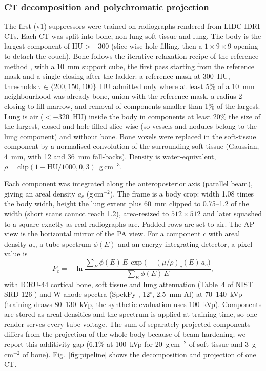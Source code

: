 \subsubsection{CT decomposition and polychromatic projection}
\label{sec:m-physics}
The first (v1) suppressors were trained on radiographs rendered from LIDC-IDRI CTs. Each CT was split into bone, non-lung soft tissue and
lung. The body is the largest component of $\mathrm{HU}>-300$ (slice-wise hole filling, then a $1{\times}9{\times}9$ opening to detach the
couch). Bone follows the iterative-relaxation recipe of the reference method \cite[Algorithm~1]{angaitkar2026anatomy}, with a 10~mm
support cube, the first pass starting from the reference mask and a single closing after the ladder: a reference mask at 300~HU,
thresholds $\tau\in\{200,150,100\}$~HU admitted only where at least 5\% of a 10~mm neighbourhood was already bone, union with the reference
mask, a radius-2 closing to fill marrow, and removal of components smaller than 1\% of the largest. Lung is air ($<-320$~HU) inside the
body in components at least 20\% the size of the largest, closed and hole-filled slice-wise (so vessels and nodules belong to the lung
component) and without bone. Bone voxels were replaced in the soft-tissue component by a normalised convolution of the surrounding soft
tissue (Gaussian, 4~mm, with 12 and 36~mm fall-backs). Density is water-equivalent, $\rho=\mathrm{clip}(1+\mathrm{HU}/1000,0,3)$~g\,cm$^{-3}$.

Each component was integrated along the anteroposterior axis (parallel beam), giving an areal density $a_c$ (g\,cm$^{-2}$). The frame is a
body crop: width 1.08 times the body width, height the lung extent plus 60~mm clipped to 0.75--1.2 of the width (short scans cannot reach
1.2), area-resized to $512\times512$ and later squashed to a square exactly as real radiographs are. Padded rows are set to air. The AP
view is the horizontal mirror of the PA view. For a component $c$ with areal density $a_c$, a tube spectrum $\phi(E)$ and an
energy-integrating detector, a pixel value is
\begin{equation}
P_c=-\ln\frac{\sum_E \phi(E)\,E\,\exp\!\big(-(\mu/\rho)_c(E)\,a_c\big)}{\sum_E\phi(E)\,E},
\label{eq:physics}
\end{equation}
with ICRU-44 \cite{icru1989report44} cortical bone, soft tissue and lung attenuation (Table~4 of NIST SRD 126 \cite{hubbell2004xraymass})
and W-anode spectra (SpekPy \cite{poludniowski2021spekpy}, 12$^\circ$, 2.5~mm Al) at 70--140~kVp (training draws 80--130~kVp, the
synthetic evaluation uses 100~kVp). Components are stored as areal densities and the spectrum is applied at training time, so one render
serves every tube voltage. The sum of separately projected components differs from the projection of the whole body because of beam
hardening; we report this additivity gap (6.1\% at 100~kVp for 20~g\,cm$^{-2}$ of soft tissue and 3~g\,cm$^{-2}$ of bone).
Fig.~\ref{fig:pipeline} shows the decomposition and projection of one CT.

